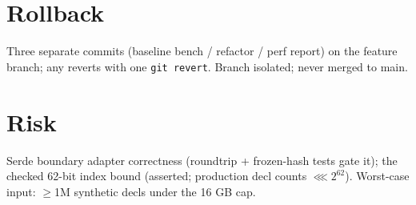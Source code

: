\documentclass[11pt]{article}
\begin{document}
\section*{Rollback}
Three separate commits (baseline bench / refactor / perf report) on the feature branch;
any reverts with one \texttt{git revert}. Branch isolated; never merged to main.

\section*{Risk}
Serde boundary adapter correctness (roundtrip + frozen-hash tests gate it); the checked
62-bit index bound (asserted; production decl counts $\lll 2^{62}$). Worst-case input:
$\geq$1M synthetic decls under the 16 GB cap.
\end{document}
